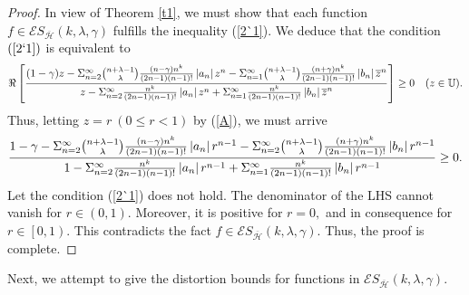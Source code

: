 \documentclass[12pt,reqno]{amsart}
\begin{document}
\begin{proof}
In view of Theorem \ref{t1}, we must show that each function $f\in \mathcal{E}%
S_{\overline{\mathcal{H}}}(k,\lambda ,\gamma )$ fulfills the inequality (\ref{2`1}). We deduce that the condition $(\ref{2`1})$ is
equivalent to 
\begin{equation}
\Re \left[ \frac{(1-\gamma )z-\Sigma_{n=2}^{\infty}\binom{n+\lambda -1%
}{\lambda }\frac{\left( n-\gamma \right) n^{k}}{(2n-1)(n-1)!}\left\vert
a_{n}\right\vert z^{n}-\Sigma_{n=1}^{\infty}\binom{n+\lambda -1}{%
\lambda }\frac{\left( n+\gamma \right) n^{k}}{(2n-1)(n-1)!}\left\vert
b_{n}\right\vert \overline{z}^{n}}{z-\Sigma_{n=2}^{\infty}\frac{n^{k}}{%
(2n-1)(n-1)!}\left\vert a_{n}\right\vert z^{n}+\Sigma_{n=1}^{\infty}
\frac{n^{k}}{(2n-1)(n-1)!}\left\vert b_{n}\right\vert \overline{z}^{n}}%
\right] \geq 0\ \ \,\,(z\in \mathbb{U}).  \label{A}
\end{equation}%
Thus, letting $z=r~(0\leq r<1)$ by (\ref{A}), we must arrive
\begin{equation}
\frac{1-\gamma -\Sigma_{n=2}^{\infty}\binom{n+\lambda -1}{\lambda }%
\frac{\left( n-\gamma \right) n^{k}}{(2n-1)(n-1)!}\left\vert
a_{n}\right\vert r^{n-1}-\Sigma_{n=2}^{\infty}\binom{n+\lambda -1}{%
\lambda }\frac{\left( n+\gamma \right) n^{k}}{(2n-1)(n-1)!}\left\vert
b_{n}\right\vert r^{n-1}}{1-\Sigma_{n=2}^{\infty}\frac{n^{k}}{%
(2n-1)(n-1)!}\left\vert a_{n}\right\vert r^{n-1}+\Sigma_{n=1}^{\infty}
\frac{n^{k}}{(2n-1)(n-1)!}\left\vert b_{n}\right\vert r^{n-1}}\geq 0.
\label{2`6}
\end{equation}%
Let the condition (\ref{2`1}) does not hold. The denominator of the LHS cannot vanish for $%
r\in \left( 0,1\right) .$ Moreover, it is positive for $r=0,$ and in
consequence for $r\in \left[ 0,1\right) .$ This contradicts the fact $f\in \mathcal{E}S_{\overline{\mathcal{H}}}(k,\lambda ,\gamma )$. Thus, the proof is complete.
\end{proof}

Next, we attempt to give the distortion bounds for functions in $\mathcal{E}S_{\overline{\mathcal{H}}}(k,\lambda ,\gamma )$.
\end{document}
